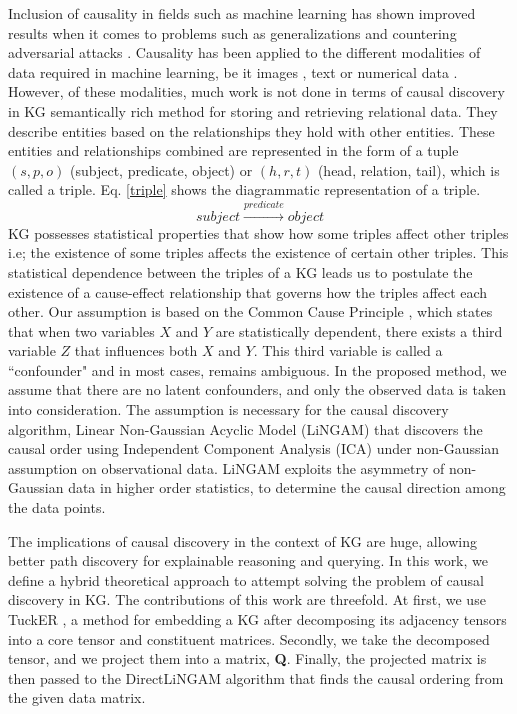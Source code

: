 \documentclass{article}
\begin{document}
Inclusion of causality in fields such as machine learning has shown improved results when it comes to problems such as generalizations and countering adversarial attacks \cite{yang2019causal}. 
Causality has been applied to the different modalities of data required in machine learning, be it images \cite{zhu2020cookgan}, text \cite{keith-etal-2020-text} or numerical data \cite{spirtes2000causation}. However, of these modalities, much work is not done in terms of causal discovery in KG \textemdash semantically rich method for storing and retrieving relational data. They describe entities based on the relationships they hold with other entities. These entities and relationships combined are represented in the form of a tuple $(s,p,o)$ (subject, predicate, object) or $(h,r,t)$ (head, relation, tail), which is called a triple. Eq. \eqref{triple} shows the diagrammatic representation of a triple.
\begin{equation}
\label{triple}
subject \xrightarrow{predicate} object
\end{equation}
KG possesses statistical properties that show how some triples affect other triples i.e; the existence of some triples affects the existence of certain other triples. This statistical dependence between the triples of a KG leads us to postulate the existence of a cause-effect relationship that governs how the triples affect each other. Our assumption is based on the Common Cause Principle \cite{hofer1999reichenbach}, which states that when two variables $X$ and $Y$ are statistically dependent, there exists a third variable $Z$ that influences both $X$ and $Y$. This third variable is called a ``confounder" and in most cases, remains ambiguous. In the proposed method, we assume that there are no latent confounders, and only the observed data is taken into consideration. The assumption is necessary for the causal discovery algorithm, Linear Non-Gaussian Acyclic Model (LiNGAM) \cite{JMLR:v7:shimizu06a} that discovers the causal order using Independent Component Analysis (ICA) \cite{Hyvaerinen2000}  under non-Gaussian assumption on observational data. LiNGAM exploits the asymmetry of non-Gaussian data in higher order statistics, to determine the causal direction among the data points.

The implications of causal discovery in the context of KG are huge, allowing better path discovery for explainable reasoning and querying. 
In this work, we define a hybrid theoretical approach to attempt solving the problem of causal discovery in KG. The contributions of this work are threefold. At first, we use TuckER \cite{Balazevic2019}, a method for embedding a KG after decomposing its adjacency tensors into a core tensor and constituent matrices. Secondly, we take the decomposed tensor, and we project them into a matrix, \textbf{Q}. Finally, the projected matrix is then passed to the DirectLiNGAM \cite{Shimizu2011} algorithm that finds the causal ordering from the given data matrix.
\end{document}

